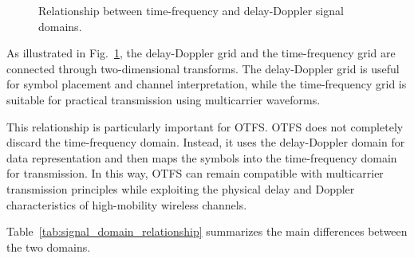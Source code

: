 \begin{figure}[H]
{
}
\caption{Relationship between time-frequency and delay-Doppler signal domains.}
\label{fig:tf_dd_relationship}

\end{figure}

As illustrated in Fig.~\ref{fig:tf_dd_relationship}, the delay-Doppler grid and the time-frequency grid are connected through two-dimensional transforms. The delay-Doppler grid is useful for symbol placement and channel interpretation, while the time-frequency grid is suitable for practical transmission using multicarrier waveforms.

This relationship is particularly important for OTFS. OTFS does not completely discard the time-frequency domain. Instead, it uses the delay-Doppler domain for data representation and then maps the symbols into the time-frequency domain for transmission. In this way, OTFS can remain compatible with multicarrier transmission principles while exploiting the physical delay and Doppler characteristics of high-mobility wireless channels.

Table~\ref{tab:signal_domain_relationship} summarizes the main differences between the two domains.

